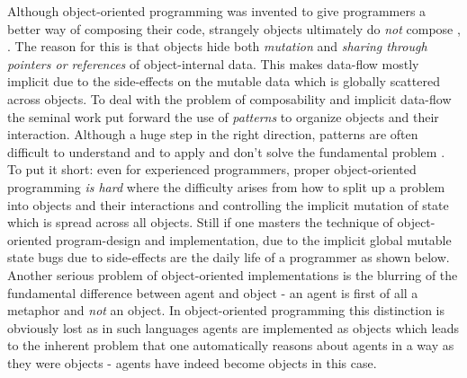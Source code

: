 Although object-oriented programming was invented to give programmers a better way of composing their code, strangely objects ultimately do \textit{not} compose \cite{bill_what_2017}, \cite{erkki_lindpere_why_2013}. The reason for this is that objects hide both \textit{mutation} and \textit{sharing through pointers or references} of object-internal data. This makes data-flow mostly implicit due to the side-effects on the mutable data which is globally scattered across objects. To deal with the problem of composability and implicit data-flow the seminal work \cite{gamma_design_1994} put forward the use of \textit{patterns} to organize objects and their interaction. Although a huge step in the right direction, patterns are often difficult to understand and to apply and don't solve the fundamental problem \cite{lawrence_krubner_object_2014}. To put it short: even for experienced programmers, proper object-oriented programming \textit{is hard} where the difficulty arises from how to split up a problem into objects and their interactions and controlling the implicit mutation of state which is spread across all objects. Still if one masters the technique of object-oriented program-design and implementation, due to the implicit global mutable state bugs due to side-effects are the daily life of a programmer as shown below.
Another serious problem of object-oriented implementations is the blurring of the fundamental difference between agent and object - an agent is first of all a metaphor and \textit{not} an object. In object-oriented programming this distinction is obviously lost as in such languages agents are implemented as objects which leads to the inherent problem that one automatically reasons about agents in a way as they were objects - agents have indeed become objects in this case. %


